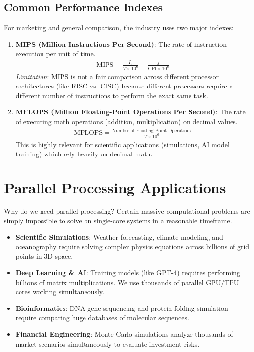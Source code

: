 \documentclass[11pt,a4paper]{article}
\begin{document}
\subsection{Common Performance Indexes}
For marketing and general comparison, the industry uses two major indexes:
\begin{enumerate}
    \item \textbf{MIPS (Million Instructions Per Second)}: The rate of instruction execution per unit of time.
    \begin{gather*}
        \text{MIPS} = \frac{I_c}{T \times 10^6} = \frac{f}{\text{CPI} \times 10^6}
    \end{gather*}
    \textit{Limitation}: MIPS is not a fair comparison across different processor architectures (like RISC vs. CISC) because different processors require a different number of instructions to perform the exact same task.
    
    \item \textbf{MFLOPS (Million Floating-Point Operations Per Second)}: The rate of executing math operations (addition, multiplication) on decimal values.
    \begin{gather*}
        \text{MFLOPS} = \frac{\text{Number of Floating-Point Operations}}{T \times 10^6}
    \end{gather*}
    This is highly relevant for scientific applications (simulations, AI model training) which rely heavily on decimal math.
\end{enumerate}

\section{Parallel Processing Applications}
Why do we need parallel processing? Certain massive computational problems are simply impossible to solve on single-core systems in a reasonable timeframe. 

\begin{itemize}
    \item \textbf{Scientific Simulations}: Weather forecasting, climate modeling, and oceanography require solving complex physics equations across billions of grid points in 3D space.
    \item \textbf{Deep Learning \& AI}: Training models (like GPT-4) requires performing billions of matrix multiplications. We use thousands of parallel GPU/TPU cores working simultaneously.
    \item \textbf{Bioinformatics}: DNA gene sequencing and protein folding simulation require comparing huge databases of molecular sequences.
    \item \textbf{Financial Engineering}: Monte Carlo simulations analyze thousands of market scenarios simultaneously to evaluate investment risks.
\end{itemize}
\end{document}
